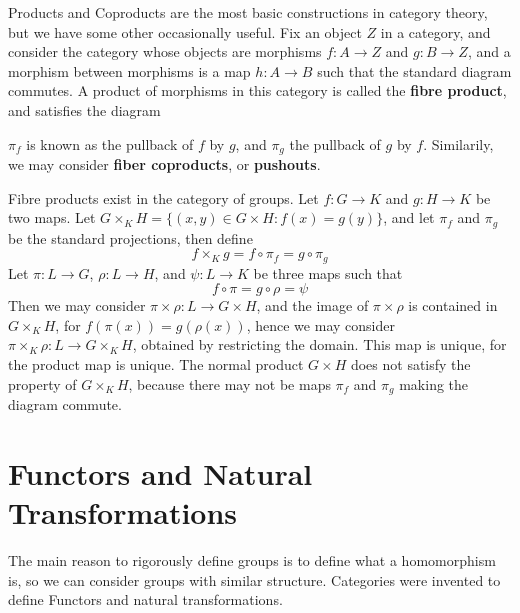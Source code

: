 Products and Coproducts are the most basic constructions in category theory, but we have some other occasionally useful. Fix an object $Z$ in a category, and consider the category whose objects are morphisms $f: A \to Z$ and $g: B \to Z$, and a morphism between morphisms is a map $h: A \to B$ such that the standard diagram commutes. A product of morphisms in this category is called the {\bf fibre product}, and satisfies the diagram
%
\begin{center}
\end{center}
%
$\pi_f$ is known as the pullback of $f$ by $g$, and $\pi_g$ the pullback of $g$ by $f$. Similarily, we may consider {\bf fiber coproducts}, or {\bf pushouts}.

\begin{example}
    Fibre products exist in the category of groups. Let $f: G \to K$ and $g: H \to K$ be two maps. Let $G \times_K H = \{ (x,y) \in G \times H : f(x) = g(y) \}$, and let $\pi_f$ and $\pi_g$ be the standard projections, then define
    \[ f \times_K g = f \circ \pi_f = g \circ \pi_g \]
    Let $\pi: L \to G$, $\rho: L \to H$, and $\psi: L \to K$ be three maps such that
    \[ f \circ \pi = g \circ \rho = \psi \]
    Then we may consider $\pi \times \rho: L \to G \times H$, and the image of $\pi \times \rho$ is contained in $G \times_K H$, for $f(\pi(x)) = g(\rho(x))$, hence we may consider $\pi \times_K \rho: L \to G \times_K H$, obtained by restricting the domain. This map is unique, for the product map is unique. The normal product $G \times H$ does not satisfy the property of $G \times_K H$, because there may not be maps $\pi_f$ and $\pi_g$ making the diagram commute.
\end{example}

\section{Functors and Natural Transformations}

The main reason to rigorously define groups is to define what a homomorphism is, so we can consider groups with similar structure. Categories were invented to define Functors and natural transformations.

